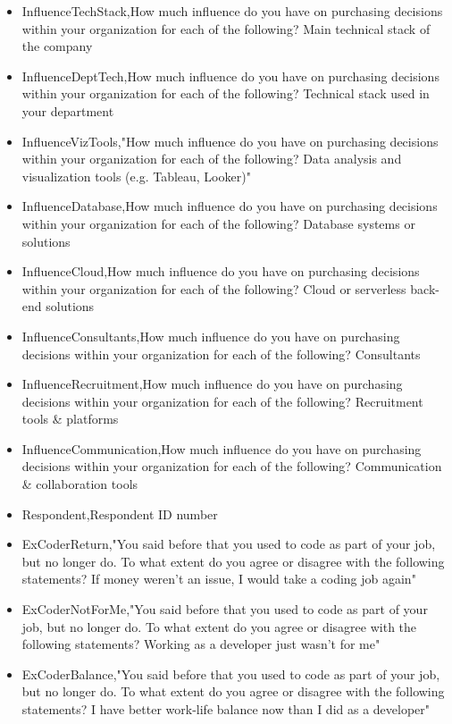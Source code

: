 \begin{appendices}
\begin{itemize}
        \item InfluenceTechStack,How much influence do you have on purchasing decisions within your organization for each of the following? Main technical stack of the company
        \item InfluenceDeptTech,How much influence do you have on purchasing decisions within your organization for each of the following? Technical stack used in your department
        \item InfluenceVizTools,"How much influence do you have on purchasing decisions within your organization for each of the following? Data analysis and visualization tools (e.g. Tableau, Looker)"
        \item InfluenceDatabase,How much influence do you have on purchasing decisions within your organization for each of the following? Database systems or solutions
        \item InfluenceCloud,How much influence do you have on purchasing decisions within your organization for each of the following? Cloud or serverless back-end solutions
        \item InfluenceConsultants,How much influence do you have on purchasing decisions within your organization for each of the following? Consultants
        \item InfluenceRecruitment,How much influence do you have on purchasing decisions within your organization for each of the following? Recruitment tools & platforms
        \item InfluenceCommunication,How much influence do you have on purchasing decisions within your organization for each of the following? Communication & collaboration tools
        \item Respondent,Respondent ID number
        \item ExCoderReturn,"You said before that you used to code as part of your job, but no longer do. To what extent do you agree or disagree with the following statements? If money weren't an issue, I would take a coding job again"
        \item ExCoderNotForMe,"You said before that you used to code as part of your job, but no longer do. To what extent do you agree or disagree with the following statements? Working as a developer just wasn't for me"
        \item ExCoderBalance,"You said before that you used to code as part of your job, but no longer do. To what extent do you agree or disagree with the following statements? I have better work-life balance now than I did as a developer"

\end{itemize}
\end{appendices}

